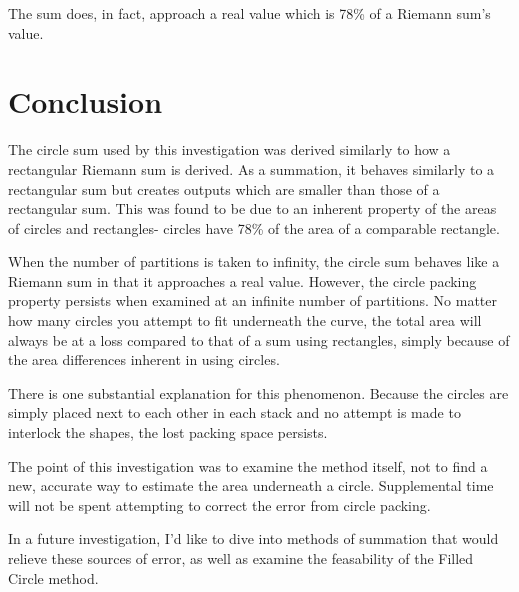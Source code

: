 \documentclass{article}
\begin{document}
      The sum does, in fact, approach a real value which is 78\% of a Riemann sum's value.

  \section{Conclusion}
    The circle sum used by this investigation was derived similarly to how a rectangular Riemann sum is derived. As a summation, it behaves similarly to a rectangular sum but creates outputs which are smaller than those of a rectangular sum. This was found to be due to an inherent property of the areas of circles and rectangles- circles have 78\% of the area of a comparable rectangle.

    When the number of partitions is taken to infinity, the circle sum behaves like a Riemann sum in that it approaches a real value. However, the circle packing property persists when examined at an infinite number of partitions. No matter how many circles you attempt to fit underneath the curve, the total area will always be at a loss compared to that of a sum using rectangles, simply because of the area differences inherent in using circles.

    There is one substantial explanation for this phenomenon. Because the circles are simply placed next to each other in each stack and no attempt is made to interlock the shapes, the lost packing space persists.

    The point of this investigation was to examine the method itself, not to find a new, accurate way to estimate the area underneath a circle. Supplemental time will not be spent attempting to correct the error from circle packing.

    In a future investigation, I'd like to dive into methods of summation that would relieve these sources of error, as well as examine the feasability of the Filled Circle method.
\end{document}
